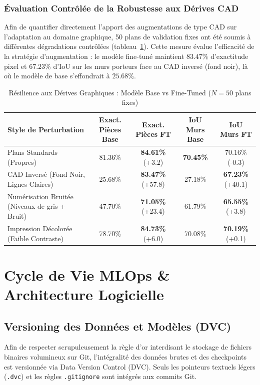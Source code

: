 \documentclass[11pt,a4paper]{report}
\begin{document}
\subsection{Évaluation Contrôlée de la Robustesse aux Dérives CAD}
Afin de quantifier directement l'apport des augmentations de type CAD sur l'adaptation au domaine graphique, 50 plans de validation fixes ont été soumis à différentes dégradations contrôlées (tableau~\ref{tab:robustness_eval}). Cette mesure évalue l'efficacité de la stratégie d'augmentation : le modèle fine-tuné maintient $83.47\%$ d'exactitude pixel et $67.23\%$ d'IoU sur les murs porteurs face au CAD inversé (fond noir), là où le modèle de base s'effondrait à $25.68\%$.

\begin{table}[H]
\centering
\caption{Résilience aux Dérives Graphiques : Modèle Base vs Fine-Tuned ($N=50$ plans fixes)}
\label{tab:robustness_eval}
\begin{tabular}{lcccc}
\toprule
\textbf{Style de Perturbation} & \textbf{Exact. Pièces Base} & \textbf{Exact. Pièces FT} & \textbf{IoU Murs Base} & \textbf{IoU Murs FT} \\
\midrule
Plans Standards (Propres) & 81.36\% & \textbf{84.61\%} (+3.2) & \textbf{70.45\%} & 70.16\% (-0.3) \\
CAD Inversé (Fond Noir, Lignes Claires) & 25.68\% & \textbf{83.47\%} (+57.8) & 27.18\% & \textbf{67.23\%} (+40.1) \\
Numérisation Bruitée (Niveaux de gris + Bruit) & 47.70\% & \textbf{71.05\%} (+23.4) & 61.79\% & \textbf{65.55\%} (+3.8) \\
Impression Décolorée (Faible Contraste) & 78.70\% & \textbf{84.73\%} (+6.0) & 70.08\% & \textbf{70.19\%} (+0.1) \\
\bottomrule
\end{tabular}
\end{table}

\newpage

\chapter{Cycle de Vie MLOps \& Architecture Logicielle}

\section{Versioning des Données et Modèles (DVC)}
Afin de respecter scrupuleusement la règle d'or interdisant le stockage de fichiers binaires volumineux sur Git, l'intégralité des données brutes et des checkpoints est versionnée via Data Version Control (DVC). Seuls les pointeurs textuels légers (\texttt{.dvc}) et les règles \texttt{.gitignore} sont intégrés aux commits Git.
\end{document}
